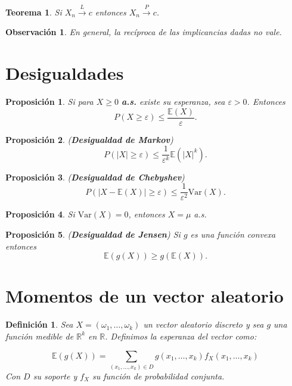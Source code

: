 \documentclass{report}
\newtheorem{thm}{Teorema}[section]
\newtheorem{prop}{Proposición}[section]
\newtheorem{dfn}{Definición}[section]
\newtheorem{obs}{Observación}[section]
\begin{document}
\begin{thm} \label{thm:conv_law_to_prob}
Si $X_n \xrightarrow{L} c$ entonces $X_n \xrightarrow{P} c$.
\end{thm}

\begin{obs}
    En general, la recíproca de las implicancias dadas no vale.
\end{obs}

\section{Desigualdades}
\begin{prop}
    Si para $X \geq 0$ \textbf{a.s.} existe su esperanza, sea $\varepsilon > 0$. Entonces
\[
P(X \geq \varepsilon) \leq \frac{\mathbb{E}(X)}{\varepsilon}.
\]
\end{prop}

\begin{prop} \label{prop:markov} (\textbf{Desigualdad de Markov})
\[
P(|X| \geq \varepsilon) \leq \frac{1}{\varepsilon^k} \mathbb{E}(|X|^k).
\]
\end{prop}

\begin{prop} \label{prop:chebyshev} (\textbf{Desigualdad de Chebyshev})
\[
P(|X - \mathbb{E}(X)| \geq \varepsilon) \leq \frac{1}{\varepsilon^2} \mathrm{Var}(X).
\]
\end{prop}

\begin{prop} \label{prop:variance_zero}
Si $\mathrm{Var}(X) = 0$, entonces $X = \mu$ a.s.
\end{prop}

\begin{prop} \label{prop:jensen} (\textbf{Desigualdad de Jensen}) Si $g$ es una función convexa entonces
\[
\mathbb{E}(g(X)) \geq g(\mathbb{E}(X)).
\]
\end{prop}

\section{Momentos de un vector aleatorio}
\begin{dfn} \label{dfn:expected_value_vector}
Sea $X = (\omega_1, \dots, \omega_k)$ un vector aleatorio discreto y sea $g$ una función medible de $\mathbb{R}^k$ en $\mathbb{R}$.
Definimos la esperanza del vector como:


\[
\mathbb{E}(g(X)) = \sum_{(x_1,\dots,x_k) \in D} g(x_1,\dots,x_k)f_X(x_1,\dots,x_k)
\]
Con $D$ su soporte y $f_X$ su función de probabilidad conjunta.
\end{dfn}
\end{document}
